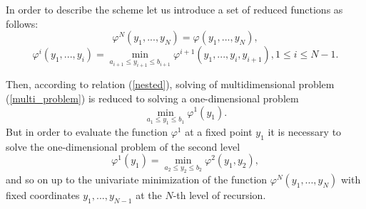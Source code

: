 \documentclass[runningheads]{llncs}
\begin{document}
In order to describe the scheme let us introduce a set of reduced functions 
as follows:
\begin{equation}\label{nested_N}
\varphi^N(y_1,...,y_N) = \varphi(y_1,...,y_N),
\end{equation}
\begin{equation}\label{nested_i}
\varphi^i(y_1,...,y_i) = \min_{a_{i+1}\leq y_{i+1}\leq b_{i+1}} \varphi^{i+1}(
y_1,...,y_i,y_{i+1}), 1\leq i\leq N-1.
\end{equation}

Then, according to relation (\ref{nested}), solving of multidimensional 
problem (\ref{multi_problem}) is reduced to solving a one-dimensional problem 
\begin{equation}\label{nested_1}
\min_{a_1\leq y_1\leq b_1}\varphi^1(y_1).
\end{equation}
But in order to evaluate the function $\varphi^1$ at a fixed point $y_1$ it 
is necessary to solve the one-dimensional problem of the second level
\begin{equation}
\varphi^1(y_1) = \min_{a_2\leq y_2\leq b_2}\varphi^2(y_1,y_2),
\end{equation}
and so on up to the univariate minimization of the function $\varphi^N(y_1
,...,y_N)$ with fixed coordinates $y_1,...,y_{N-1}$ at the $N$-th level of 
recursion.


%
%
%
 
 
\end{document}
